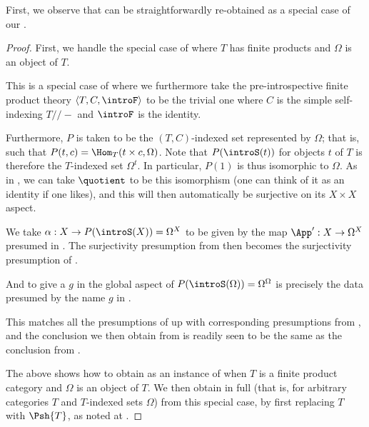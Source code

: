 First, we observe that  can be straightforwardly re-obtained as a special case of our .
\begin{proof}
First, we handle the special case of  where $T$ has finite products and $\Omega$ is an object of $T$.

This is a special case of  where we furthermore take the pre-introspective finite product theory $\langle T, C, \introF \rangle$ to be the trivial one where $C$ is the simple self-indexing $T//-$ and $\introF$ is the identity.

Furthermore, $P$ is taken to be the $(T, C)$-indexed set represented by $\Omega$; that is, such that $P(t, c) = \Hom_T(t \times c, \Omega)$. Note that $P(\introS(t))$ for objects $t$ of $T$ is therefore the $T$-indexed set $\Omega^t$. In particular, $P(1)$ is thus isomorphic to $\Omega$. As in , we can take $\quotient$ to be this isomorphism (one can think of it as an identity if one likes), and this will then automatically be surjective on its $X \times X$ aspect.

We take $\alpha : X \to P(\introS(X)) = \Omega^X$ to be given by the map $\App' : X \to \Omega^X$ presumed in . The surjectivity presumption from  then becomes the surjectivity presumption of . 

And to give a $g$ in the global aspect of $P(\introS(\Omega)) = \Omega^\Omega$ is precisely the data presumed by the name $g$ in .

This matches all the presumptions of  up with corresponding presumptions from , and the conclusion we then obtain from  is readily seen to be the same as the conclusion from .

The above shows how to obtain  as an instance of  when $T$ is a finite product category and $\Omega$ is an object of $T$. We then obtain  in full (that is, for arbitrary categories $T$ and $T$-indexed sets $\Omega$) from this special case, by first replacing $T$ with $\Psh{T}$, as noted at .
\end{proof}

